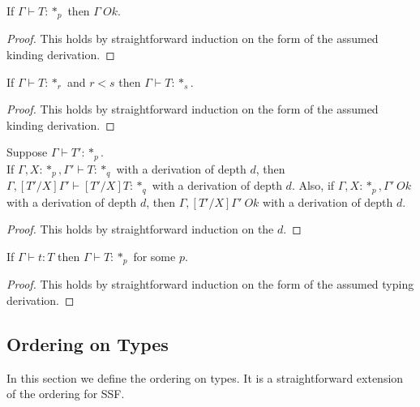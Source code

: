 \begin{lemma}
  If $\Gamma \vdash T:*_p$ then $\Gamma\ Ok$.
  \label{lemma:kinding_ok_ssfp}
\end{lemma}
\begin{proof}
  This holds by straightforward induction on the form of the assumed
  kinding derivation.
\end{proof}

\begin{lemma}
  If $\Gamma \vdash T:*_r$ and $r < s$ then $\Gamma \vdash T:*_s$.
  \label{lemma:level_weakening_for_kinding_ssfp}
\end{lemma}
\begin{proof}
  This holds by straightforward induction on the form of the assumed
  kinding derivation.
\end{proof}

\begin{lemma}
  Suppose $\Gamma \vdash T':*_p$.  \\ If $\Gamma,X:*_p,\Gamma' \vdash T:*_q$ 
  with a derivation of depth $d$, then $\Gamma,[T'/X]\Gamma' \vdash [T'/X]T:*_q$
  with a derivation of depth $d$.
  Also, if $\Gamma,X:*_p,\Gamma'\ Ok$ with a derivation of depth $d$, then 
  $\Gamma,[T'/X]\Gamma'\ Ok$ with a derivation of depth $d$.
  \label{lemma:substitution_for_kinding_ssfp}
\end{lemma}
\begin{proof}
  This holds by straightforward induction on the $d$.
\end{proof}

\begin{lemma}[Regularity]
  If $\Gamma \vdash t:T$ then $\Gamma \vdash T:*_p$ for some $p$.
  \label{lemma:regularity_ssfp}
\end{lemma}
\begin{proof}
  This holds by straightforward induction on the form of the assumed
  typing derivation.
\end{proof}

\subsection{Ordering on Types}
\label{subsec:ordering_on_types_ssfp}
In this section we define the ordering on types. It is a
straightforward extension of the ordering for SSF.

